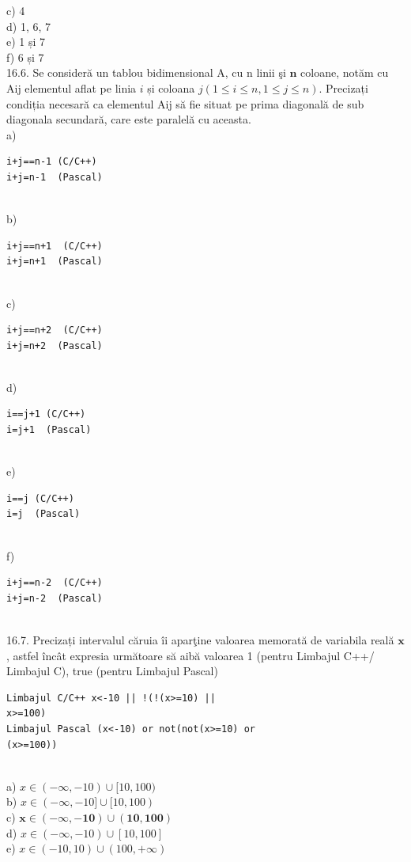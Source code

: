 {{c) 4
\\
d) 1, 6, 7 
\\
e) 1 și 7
\\
f) 6 și 7
\\
16.6. Se consideră un tablou bidimensional A, cu n linii şi $\mathbf{n}$ coloane, notăm cu Aij elementul aflat pe linia $i$ și coloana $j(1 \leq i \leq n, 1 \leq j \leq n)$. Precizați condiția necesară ca elementul Aij să fie situat pe prima diagonală de sub diagonala secundară, care este paralelă cu aceasta.
\\
a) \begin{verbatim}
i+j==n-1 (C/C++) 
i+j=n-1  (Pascal)
\end{verbatim}
\\
b) \begin{verbatim}
i+j==n+1  (C/C++) 
i+j=n+1  (Pascal)
\end{verbatim}
\\
c) \begin{verbatim}
i+j==n+2  (C/C++) 
i+j=n+2  (Pascal)
\end{verbatim}
\\
d) \begin{verbatim}
i==j+1 (C/C++) 
i=j+1  (Pascal)
\end{verbatim}
\\
e) \begin{verbatim}
i==j (C/C++) 
i=j  (Pascal)
\end{verbatim}
\\
f) \begin{verbatim}
i+j==n-2  (C/C++) 
i+j=n-2  (Pascal)
\end{verbatim}
\\
16.7. Precizați intervalul căruia îi aparţine valoarea memorată de variabila reală $\mathbf{x}$, astfel încât expresia următoare să aibă valoarea 1 (pentru Limbajul C++/ Limbajul C), true (pentru Limbajul Pascal)
\begin{verbatim}
Limbajul C/C++ x<-10 || !(!(x>=10) || 
x>=100)
Limbajul Pascal (x<-10) or not(not(x>=10) or 
(x>=100))
\end{verbatim}
\\
a) $x \in(-\infty,-10) \cup[10,100)$
\\
b) $x \in(-\infty,-10] \cup[10,100)$
\\
c) $\mathbf{x} \in(-\infty,-\mathbf{1 0}) \cup(\mathbf{1 0}, \mathbf{1 0 0})$
\\
d) $x \in(-\infty,-10) \cup[10,100]$
\\
e) $x \in(-10,10) \cup(100,+\infty)$
\\
}}
